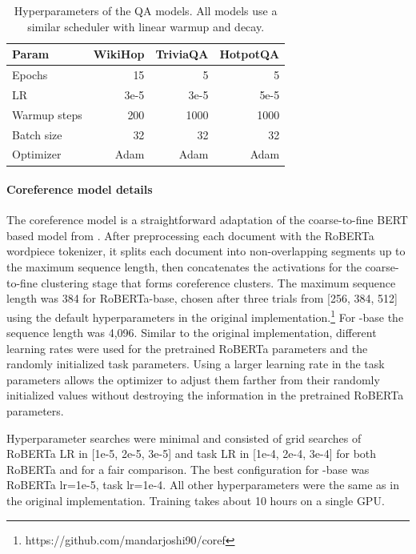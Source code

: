 \begin{table}[!h]
 \centering
 \small
\begin{tabular}{@{}lrrr@{}}
\toprule
Param & WikiHop & TriviaQA & HotpotQA \\
\midrule
Epochs & 15 & 5 & 5 \\
LR & 3e-5 & 3e-5 & 5e-5\\
Warmup steps & 200 & 1000 & 1000 \\
Batch size & 32 & 32 & 32 \\
Optimizer & Adam & Adam & Adam \\
\bottomrule
\end{tabular}
\caption{Hyperparameters of the QA models. All models use a similar scheduler with linear warmup and decay.}
\label{tab:qa-hyperparams}
 \end{table}


\paragraph{Coreference model details}
The coreference model is a straightforward adaptation of the coarse-to-fine BERT based model from \citet{joshi-etal-2019-bert}.  After preprocessing each document with the RoBERTa wordpiece tokenizer, it splits each document into non-overlapping segments up to the maximum sequence length, then concatenates the activations for the coarse-to-fine clustering stage that forms coreference clusters.
The maximum sequence length was 384 for RoBERTa-base, chosen after three trials from [256, 384, 512] using the default hyperparameters in the original  implementation.\footnote{https://github.com/mandarjoshi90/coref}  For \model-base the sequence length was 4,096.  Similar to the original implementation, different learning rates were used for the pretrained RoBERTa parameters and the randomly initialized task parameters.  Using a larger learning rate in the task parameters allows the optimizer to adjust them farther from their randomly initialized values without destroying the information in the pretrained RoBERTa parameters.  

Hyperparameter searches were minimal and consisted of grid searches of RoBERTa LR in [1e-5, 2e-5, 3e-5] and task LR in [1e-4, 2e-4, 3e-4] for both RoBERTa and \model for a fair comparison. The best configuration for \model-base was RoBERTa lr=1e-5, task lr=1e-4.  All other hyperparameters were the same as in the original implementation.  Training takes about 10 hours on a single GPU.

